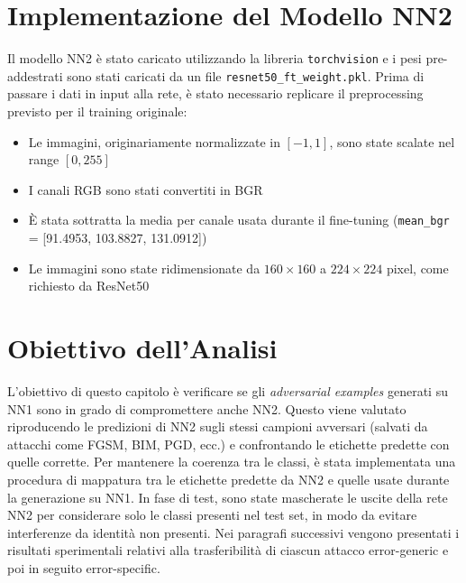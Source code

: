     \section{Implementazione del Modello NN2}
        Il modello NN2 è stato caricato utilizzando la libreria \texttt{torchvision} e i pesi pre-addestrati sono stati caricati da un file \texttt{resnet50\_ft\_weight.pkl}. Prima di passare i dati in input alla rete, è stato necessario replicare il preprocessing previsto per il training originale:
            \begin{itemize}
              \item Le immagini, originariamente normalizzate in $[-1, 1]$, sono state scalate nel range $[0, 255]$
              
              \item I canali RGB sono stati convertiti in BGR
              
              \item È stata sottratta la media per canale usata durante il fine-tuning (\texttt{mean\_bgr} = [91.4953, 103.8827, 131.0912])
              
              \item Le immagini sono state ridimensionate da $160 \times 160$ a $224 \times 224$ pixel, come richiesto da ResNet50
            \end{itemize}
    
    \section{Obiettivo dell’Analisi}
        L’obiettivo di questo capitolo è verificare se gli \textit{adversarial examples} generati su NN1 sono in grado di compromettere anche NN2. Questo viene valutato riproducendo le predizioni di NN2 sugli stessi campioni avversari (salvati da attacchi come FGSM, BIM, PGD, ecc.) e confrontando le etichette predette con quelle corrette.
        Per mantenere la coerenza tra le classi, è stata implementata una procedura di mappatura tra le etichette predette da NN2 e quelle usate durante la generazione su NN1. In fase di test, sono state mascherate le uscite della rete NN2 per considerare solo le classi presenti nel test set, in modo da evitare interferenze da identità non presenti.
        Nei paragrafi successivi vengono presentati i risultati sperimentali relativi alla trasferibilità di ciascun attacco error-generic e poi in seguito error-specific.

